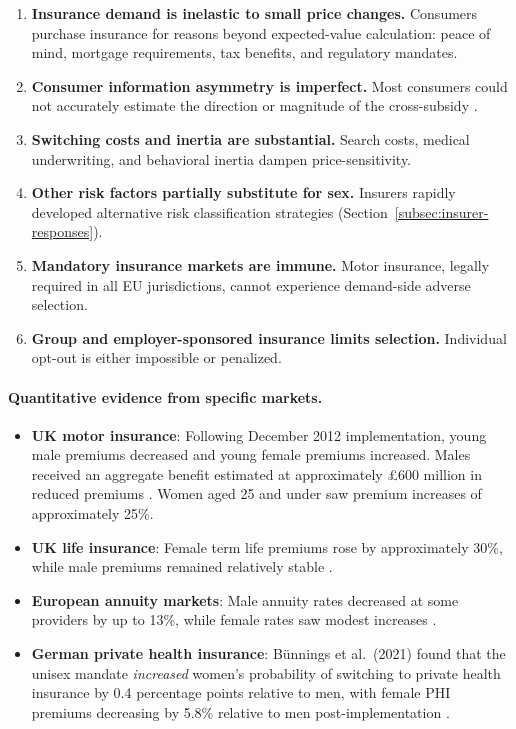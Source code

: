 \documentclass[12pt,a4paper]{article}
\begin{document}
\begin{enumerate}
  \item \textbf{Insurance demand is inelastic to small price changes.} Consumers purchase insurance for reasons beyond expected-value calculation: peace of mind, mortgage requirements, tax benefits, and regulatory mandates.

  \item \textbf{Consumer information asymmetry is imperfect.} Most consumers could not accurately estimate the direction or magnitude of the cross-subsidy \cite{schmeiser2014}.

  \item \textbf{Switching costs and inertia are substantial.} Search costs, medical underwriting, and behavioral inertia dampen price-sensitivity.

  \item \textbf{Other risk factors partially substitute for sex.} Insurers rapidly developed alternative risk classification strategies (Section~\ref{subsec:insurer-responses}).

  \item \textbf{Mandatory insurance markets are immune.} Motor insurance, legally required in all EU jurisdictions, cannot experience demand-side adverse selection.

  \item \textbf{Group and employer-sponsored insurance limits selection.} Individual opt-out is either impossible or penalized.
\end{enumerate}

\paragraph{Quantitative evidence from specific markets.}

\begin{itemize}
  \item \textbf{UK motor insurance}: Following December 2012 implementation, young male premiums decreased and young female premiums increased. Males received an aggregate benefit estimated at approximately \pounds600 million in reduced premiums \cite{abi_gender_faq, oxera2010}. Women aged 25 and under saw premium increases of approximately 25\%.

  \item \textbf{UK life insurance}: Female term life premiums rose by approximately 30\%, while male premiums remained relatively stable \cite{schmeiser2014}.

  \item \textbf{European annuity markets}: Male annuity rates decreased at some providers by up to 13\%, while female rates saw modest increases \cite{aseervatham2016}.

  \item \textbf{German private health insurance}: B\"{u}nnings et al.\ (2021) found that the unisex mandate \emph{increased} women's probability of switching to private health insurance by 0.4 percentage points relative to men, with female PHI premiums decreasing by 5.8\% relative to men post-implementation \cite{bunnings2021}.
\end{itemize}
\end{document}
